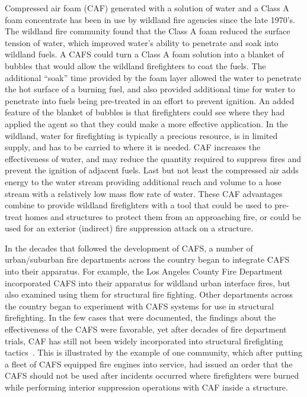 \documentclass[12pt,oneside]{book}
\begin{document}
Compressed air foam (CAF) generated with a solution of water and a Class A foam concentrate has been in use by wildland fire agencies since the late 1970's. The wildland fire community found that the Class A foam reduced the surface tension of water, which improved water's ability to penetrate and soak into wildland fuels. A CAFS could turn a Class A foam solution into a blanket of bubbles that would allow the wildland firefighters to coat the fuels. The additional ``soak'' time provided by the foam layer allowed the water to penetrate the hot surface of a burning fuel, and also provided additional time for water to penetrate into fuels being pre-treated in an effort to prevent ignition. An added feature of the blanket of bubbles is that firefighters could see where they had applied the agent so that they could make a more effective application. In the wildland, water for firefighting is typically a precious resource, is in limited supply, and has to be carried to where it is needed. CAF increases the effectiveness of water, and may reduce the quantity required to suppress fires and prevent the ignition of adjacent fuels. Last but not least the compressed air adds energy to the water stream providing additional reach and volume to a hose stream with a relatively low mass flow rate of water. These CAF advantages combine to provide wildland firefighters with a tool that could be used to pre-treat homes and structures to protect them from an approaching fire, or could be used for an exterior (indirect) fire suppression attack on a structure.

In the decades that followed the development of CAFS, a number of urban/suburban fire departments across the country began to integrate CAFS into their apparatus. For example, the Los Angeles County Fire Department incorporated CAFS into their apparatus for wildland urban interface fires, but also examined using them for structural fire fighting. Other departments across the country began to experiment with CAFS systems for use in structural firefighting. In the few cases that were documented, the findings about the effectiveness of the CAFS were favorable, yet after decades of fire department trials, CAF has still not been widely incorporated into structural firefighting tactics~\cite{USFA:CAFS,Lorh:2002}. This is illustrated by the example of one community, which after putting a fleet of CAFS equipped fire engines into service, had issued an order that the CAFS should not be used after incidents occurred where firefighters were burned while performing interior suppression operations with CAF inside a structure.
\end{document}
